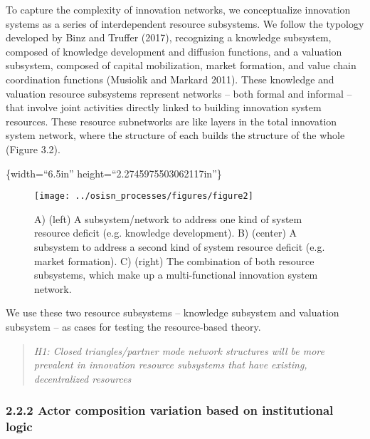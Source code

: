 \documentclass[twoside,12pt,final]{ucthesis-CA2012}
\begin{document}
\begin{ucmainmatter}
To capture the complexity of innovation networks, we conceptualize
innovation systems as a series of interdependent \textquotesingle resource
subsystems.\textquotesingle{} We follow the typology developed by Binz and Truffer
(2017), recognizing a knowledge subsystem, composed of knowledge
development and diffusion functions, and a valuation subsystem, composed
of capital mobilization, market formation, and value chain coordination
functions (Musiolik and Markard 2011). These knowledge and valuation
resource subsystems represent networks -- both formal and informal --
that involve joint activities directly linked to building innovation
system resources. These resource subnetworks are like layers in the
total innovation system network, where the structure of each builds the
structure of the whole (Figure 3.2).

\{width=``6.5in'' height=``2.2745975503062117in''\}
\begin{figure}

{\centering \texttt{[image: ../osisn\_processes/figures/figure2]} 

}

\caption{A) (left) A subsystem/network to address one kind of system resource deficit (e.g. knowledge development). B) (center) A subsystem to address a second kind of system resource deficit (e.g. market formation). C) (right) The combination of both resource subsystems, which make up a multi-functional innovation system network.}\label{fig:unnamed-chunk-22}
\end{figure}
We use these two resource subsystems -- knowledge subsystem and
valuation subsystem -- as cases for testing the resource-based theory.
\begin{quote}
\emph{H1: Closed triangles/partner mode network structures will be more
prevalent in innovation resource subsystems that have existing,
decentralized resources}
\end{quote}
\hypertarget{actor-composition-variation-based-on-institutional-logic}{%
\subsubsection{2.2.2 Actor composition variation based on institutional logic}\label{actor-composition-variation-based-on-institutional-logic}}


\end{ucmainmatter}
\end{document}

